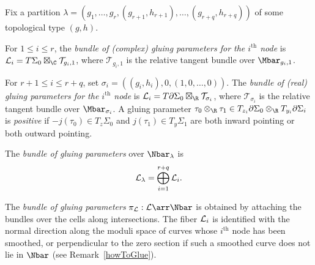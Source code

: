 \begin{definition}
Fix a partition $\lambda=(g_1,\ldots,g_r,(g_{r+1},h_{r+1}),\ldots,(g_{r+q},h_{r+q}))$ of some topological type $(g,h)$.

For $1 \leq i \leq r$, the \emph{bundle of (complex) gluing parameters for the $i^{\text{th}}$ node} is $\L_i = T\Sigma_0 \boxtimes_\C \mathcal{T}_{g_i,1}$, where $\mathcal{T}_{g_i,1}$ is the relative tangent bundle over $\Mbar_{g_i,1}$.

For $r+1\leq i \leq r+q$, set $\sigma_i=((g_i,h_i),0,(1,0,\ldots,0))$. The \emph{bundle of (real) gluing parameters for the $i^{\text{th}}$ node} is $\L_i = T\partial\Sigma_0 \boxtimes_\R \mathcal{T}_{\sigma_i}$, where $\mathcal{T}_{\sigma_i}$ is the relative tangent bundle over $\Mbar_{\sigma_i}$. A gluing parameter $\tau_0 \otimes_\R \tau_1 \in T_{z_i}\partial\Sigma_0 \otimes_\R T_{y_i}\partial\Sigma_i$ is \emph{positive} if $-j(\tau_0) \in T_z\Sigma_0$ and $j(\tau_1) \in T_y\Sigma_1$ are both inward pointing or both outward pointing.

The \emph{bundle of gluing parameters} over $\Nbar_\lambda$ is
\[
\mathcal{L}_\lambda = \bigoplus\limits_{i=1}^{r+q} \mathcal{L}_i.
\]

The \emph{bundle of gluing parameters} $\pi_\L:\L\arr\Nbar$ is obtained by attaching the bundles over the cells along intersections. The fiber $\mathcal{L}_i$ is identified with the normal direction along the moduli space of curves whose $i^{\text{th}}$ node has been smoothed, or perpendicular to the zero section if such a smoothed curve does not lie in $\Nbar$ (see Remark~\ref{howToGlue}).
\end{definition}

